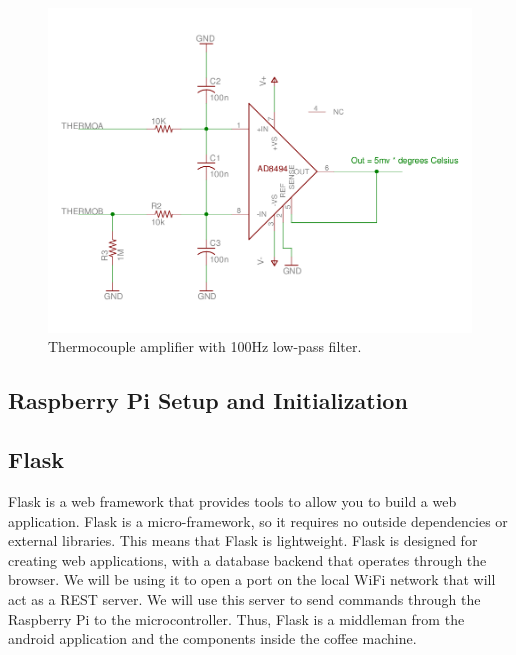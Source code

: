 \documentclass[conference]{IEEEtran}
\begin{document}
\begin{figure}
  \centering
    \includegraphics[width=1.8\columnwidth]{ThermoAmp}
    \caption{Thermocouple amplifier with 100Hz low-pass filter.}
\end{figure}


\subsection{Raspberry Pi Setup and Initialization}
 
\subsection{Flask}
Flask is a web framework that provides tools to allow you to build a web application.
Flask is a micro-framework, so it requires no outside dependencies or external libraries.
This means that Flask is lightweight. Flask is designed for creating web applications,
with a database backend that operates through the browser. We will be using it to open
a port on the local WiFi network that will act as a REST server. We will use
this server to send commands through the Raspberry Pi to the microcontroller. Thus, Flask is a middleman from the 
android application and the components inside the coffee machine.
\end{document}

